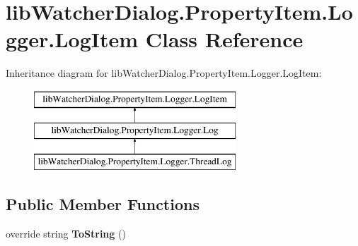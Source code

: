 \hypertarget{classlib_watcher_dialog_1_1_property_item_1_1_logger_1_1_log_item}{\section{lib\+Watcher\+Dialog.\+Property\+Item.\+Logger.\+Log\+Item Class Reference}
\label{classlib_watcher_dialog_1_1_property_item_1_1_logger_1_1_log_item}
}
Inheritance diagram for lib\+Watcher\+Dialog.\+Property\+Item.\+Logger.\+Log\+Item\+:\begin{figure}[H]
\begin{center}
\leavevmode
\includegraphics[height=3.000000cm]{classlib_watcher_dialog_1_1_property_item_1_1_logger_1_1_log_item}
\end{center}
\end{figure}
\subsection*{Public Member Functions}
\begin{DoxyCompactItemize}
\item 
\hypertarget{classlib_watcher_dialog_1_1_property_item_1_1_logger_1_1_log_item_a49d38e0baf21c6f98f75e9986af6a12e}{override string {\bfseries To\+String} ()}\label{classlib_watcher_dialog_1_1_property_item_1_1_logger_1_1_log_item_a49d38e0baf21c6f98f75e9986af6a12e}

\end{DoxyCompactItemize}
